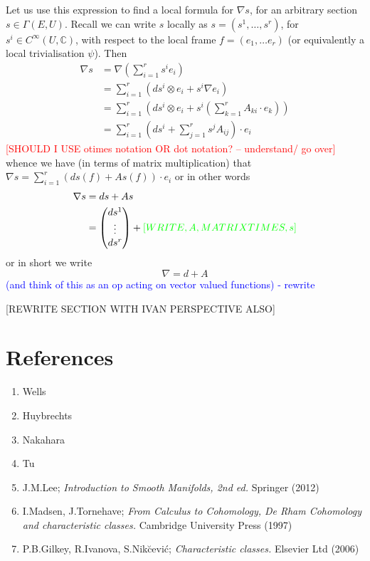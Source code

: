 \documentclass[a4paper]{article}
\theoremstyle{definition} \newtheorem*{definition}{Definition}
\theoremstyle{definition} \newtheorem*{definitions}{Definitions}
\theoremstyle{plain} \newtheorem{theorem}{Theorem}[section]
\theoremstyle{plain} \newtheorem{proposition}[theorem]{Proposition}
\theoremstyle{plain} \newtheorem{corollary}[theorem]{Corollary}
\theoremstyle{plain} \newtheorem{lemma}[theorem]{Lemma}
\theoremstyle{plain} \newtheorem{example}[theorem]{Example}
\newcommand{\checkCorrect}[1]{\textcolor{red}{#1}}
\newcommand{\explainFurther}[1]{\textcolor{blue}{#1}}
\newcommand{\finish}[1]{\textcolor{green}{#1}}
\newcommand{\complexnos}{\mathbb{C}}
\newcommand{\smoothCmaps}{C^\infty (U, \complexnos)}
\begin{document}
Let us use this expression to find a local formula for $\nabla s$,  for an arbitrary section $s\in \Gamma(E, U)$.
Recall we can write $s$ locally as $s=(s^1, \ldots,  s^r)$,  for $s^i\in \smoothCmaps$,  with respect to the local frame $f=(e_1, \ldots e_r)$ (or equivalently a local trivialisation $\psi$).  Then
\begin{align*}
\nabla s & = \nabla (\sum_{i=1}^r s^i e_i) \\
& = \sum_{i=1}^r (d s^i \otimes e_i + s^i \nabla e_i) \\
& = \sum_{i=1}^r (d s^i \otimes e_i + s^i (\sum_{k=1}^r A_{ki}\cdot e_k )) \\
& = \sum_{i=1}^r (d s^i + \sum_{j=1}^r s^j A_{ij})\cdot e_i 
\end{align*}
\checkCorrect{[SHOULD I USE otimes notation OR dot notation? -- understand/ go over]}
whence we have (in terms of matrix multiplication) that 
$\nabla s = \sum_{i=1}^r (d s(f) + As(f))\cdot e_i$
or in other words
\begin{align*}
\nabla s & = ds + As \\ 
& = \begin{pmatrix}ds^1 \\ \vdots \\ ds^r\end{pmatrix} + \finish{[WRITE,  A,  MATRIX TIMES,  s]}
\end{align*}
or in short we write
$$\nabla = d + A$$
\explainFurther{(and think of this as an op acting on vector valued functions) - rewrite}

[REWRITE SECTION WITH IVAN PERSPECTIVE ALSO]

\section*{References}
\begin{enumerate}
\item Wells
\item Huybrechts
\item Nakahara
\item Tu
\item J.M.Lee; \textit{Introduction to Smooth Manifolds, 2nd ed.} Springer (2012)
\item I.Madsen, J.Tornehave; \textit{From Calculus to Cohomology, De Rham Cohomology and characteristic classes.} Cambridge University Press (1997)
\item P.B.Gilkey, R.Ivanova, S.Nik{\u c}evi\'c; \textit{Characteristic classes.} Elsevier Ltd (2006)
\end{enumerate}
\end{document}
